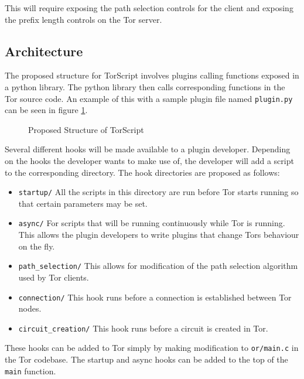 \documentclass[9pt,technote]{IEEEtran}
\begin{document}
This will require exposing the path selection controls for the client and exposing the prefix length controls on the Tor server.

\subsection{Architecture}
The proposed structure for TorScript involves plugins calling functions exposed in a python library. The python library then calls corresponding functions in the Tor source code. An example of this with a sample plugin file named \texttt{plugin.py} can be seen in figure \ref{fig:structure}.\\

\begin{figure}[h!]
\centering
{}
\caption{Proposed Structure of TorScript}
\label{fig:structure}
\end{figure}

Several different hooks will be made available to a plugin developer. Depending on
the hooks the developer wants to make use of, the developer will add a script to
the corresponding directory. The hook directories are proposed as follows:
\begin{itemize}
\item \texttt{startup/} All the scripts in this directory are run before Tor starts
	running so that certain parameters may be set.
\item \texttt{async/} For scripts that will be running continuously while Tor is
	running. This allows the plugin developers to write plugins that change
	Tors behaviour on the fly.
\item \texttt{path\_selection/} This allows for modification of the path
	selection algorithm used by Tor clients.
\item \texttt{connection/} This hook runs before a connection is established
	between Tor nodes.
\item \texttt{circuit\_creation/} This hook runs before a circuit is created in
	Tor.
\end{itemize}
These hooks can be added to Tor simply by making modification to
\texttt{or/main.c} in the Tor codebase. The startup and async hooks can be added
to the top of the \texttt{main} function.
\end{document}

